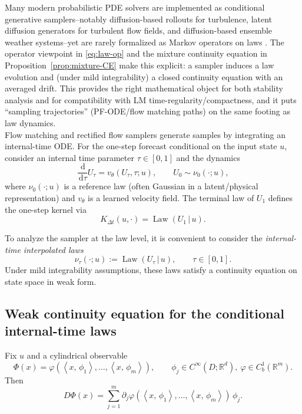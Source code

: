 \documentclass{article}
\numberwithin{equation}{section}
\theoremstyle{plain}
\theoremstyle{definition}
\theoremstyle{remark}
\newcommand{\R}{\mathbb{R}}
\newcommand{\dd}{\,\mathrm{d}}
\DeclareMathOperator{\Law}{Law}
\newcommand{\ip}[2]{\left\langle #1,\,#2 \right\rangle}
\begin{document}
Many modern probabilistic PDE solvers are implemented as conditional generative samplers--notably diffusion-based rollouts for turbulence, latent diffusion generators for turbulent flow fields, and diffusion-based ensemble weather systems--yet are rarely formalized as Markov operators on laws \cite{kohl2023benchmarking,du2024conditional, price2025probabilistic}.
The operator viewpoint in \eqref{eq:law-op} and the mixture continuity equation in Proposition~\ref{prop:mixture-CE} make this explicit: a sampler induces a law evolution and (under mild integrability) a closed continuity equation with an averaged drift. This provides the right mathematical object for both stability analysis and for compatibility with LM time-regularity/compactness, and it puts “sampling trajectories” (PF-ODE/flow matching paths) on the same footing as law dynamics.\\

Flow matching and rectified flow samplers generate samples by integrating an internal-time ODE. For the one-step forecast
conditional on the input state $u$, consider an internal time parameter $\tau\in[0,1]$ and the dynamics
\begin{equation}\label{eq:fm-ode}
\frac{\dd}{\dd\tau}U_\tau = v_\theta(U_\tau,\tau;u),\qquad U_0\sim \nu_0(\cdot;u),
\end{equation}
where $\nu_0(\cdot;u)$ is a reference law (often Gaussian in a latent/physical representation) and $v_\theta$ is a learned
velocity field. The terminal law of $U_1$ defines the one-step kernel via
\[
K_{\Delta t}(u,\cdot) = \Law(U_1\,|\,u).
\]

To analyze the sampler at the law level, it is convenient to consider the \emph{internal-time interpolated laws}
\[
\nu_\tau(\cdot;u) := \Law(U_\tau\,|\,u),\qquad \tau\in[0,1].
\]
Under mild integrability assumptions, these laws satisfy a continuity equation on state space in weak form.

\subsection{Weak continuity equation for the conditional internal-time laws}

Fix $u$ and a cylindrical observable
\[
\Phi(x) = \varphi(\ip{x}{\phi_1},\dots,\ip{x}{\phi_m}),
\qquad \phi_j\in C^\infty(D;\R^d),\ \varphi\in C_b^1(\R^m).
\]
Then
\[
D\Phi(x)=\sum_{j=1}^m \partial_j\varphi(\ip{x}{\phi_1},\dots,\ip{x}{\phi_m})\,\phi_j.
\]
\end{document}
